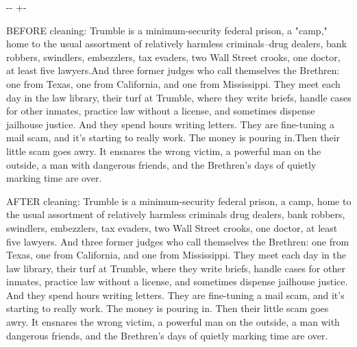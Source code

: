 \documentclass[letterpaper,10pt,english]{sphinxmanual}
\newlength\nbsphinxcodecellspacing
\begin{document}
{

\kern-\sphinxverbatimsmallskipamount\kern-\baselineskip
\kern+\FrameHeightAdjust\kern-\fboxrule
\vspace{\nbsphinxcodecellspacing}

\begin{sphinxVerbatim}[commandchars=\\\{\}]
BEFORE cleaning:
 Trumble is a minimum-security federal prison, a "camp," home to the usual assortment of relatively harmless criminals--drug dealers, bank robbers, swindlers, embezzlers, tax evaders, two Wall Street crooks, one doctor, at least five lawyers.And three former judges who call themselves the Brethren: one from Texas, one from California, and one from Mississippi. They meet each day in the law library, their turf at Trumble, where they write briefs, handle cases for other inmates, practice law without a license, and sometimes dispense jailhouse justice. And they spend hours writing letters. They are fine-tuning a mail scam, and it's starting to really work. The money is pouring in.Then their little scam goes awry. It ensnares the wrong victim, a powerful man on the outside, a man with dangerous friends, and the Brethren's days of quietly marking time are over.

AFTER cleaning:
Trumble is a minimum-security federal prison, a camp, home to the usual assortment of relatively harmless criminals drug dealers, bank robbers, swindlers, embezzlers, tax evaders, two Wall Street crooks, one doctor, at least five lawyers. And three former judges who call themselves the Brethren: one from Texas, one from California, and one from Mississippi. They meet each day in the law library, their turf at Trumble, where they write briefs, handle cases for other inmates, practice law without a license, and sometimes dispense jailhouse justice. And they spend hours writing letters. They are fine-tuning a mail scam, and it's starting to really work. The money is pouring in. Then their little scam goes awry. It ensnares the wrong victim, a powerful man on the outside, a man with dangerous friends, and the Brethren's days of quietly marking time are over.
\end{sphinxVerbatim}
}

{
\begin{sphinxVerbatim}[commandchars=\\\{\}]
\llap{\color{nbsphinxin}[23]:\,\hspace{\fboxrule}\hspace{\fboxsep}}  \PYG{p}{[}    \PYG{p}{]}
\end{sphinxVerbatim}
}
\end{document}
